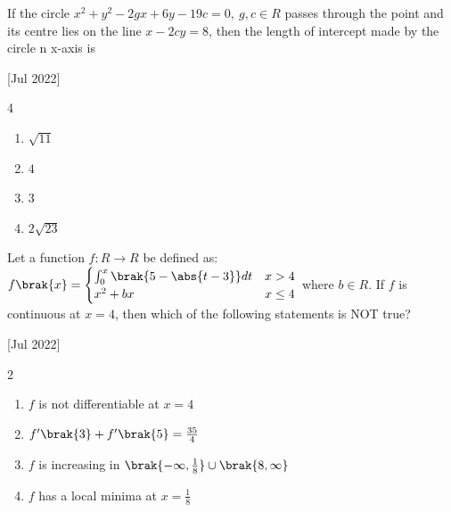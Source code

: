     \item If the circle $x^2+y^2-2gx+6y-19c=0,\ g,c\in R$ passes through the point  and its centre lies on the line $x-2cy=8$, then the length of intercept made by the circle n x-axis is 
    
    \hfill{[Jul 2022]}

		\begin{multicols}{4}
			\begin{enumerate}
				\item $\sqrt{11}$
				\item $4$
				\item $3$
				\item $2\sqrt{23}$
			\end{enumerate}
		\end{multicols}

    \item Let a function $f:R\to R$ be defined as:
    $f\brak{x}=
    \begin{cases}
    \int_0^x\brak{5-\abs{t-3}}dt & x>4\\
    x^2+bx & x\leq 4
    \end{cases}
    $ where $b\in R$. If $f$ is continuous at $x=4$, then which of the following statements is NOT true?
    
    \hfill{[Jul 2022]}

		\begin{multicols}{2}
			\begin{enumerate}
				\item $f$ is not differentiable at $x=4$
				\item $f'\brak{3}+f'\brak{5}=\frac{35}{4}$
				\item $f$ is increasing in $\brak{-\infty, \frac{1}{8}}\cup\brak{8,\infty}$
				\item $f$ has a local minima at $x=\frac{1}{8}$
			\end{enumerate}
		\end{multicols}
  

